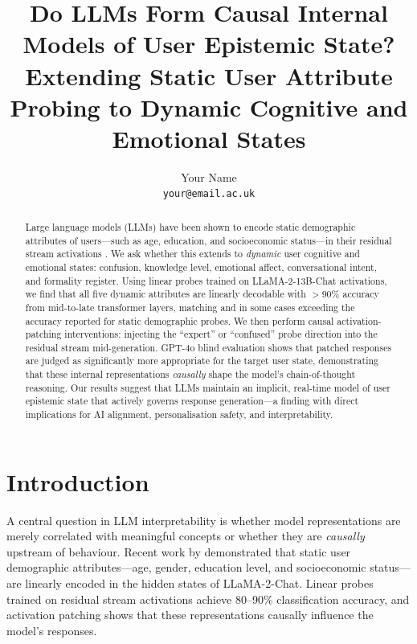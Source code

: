 \documentclass[11pt]{article}
\title{\textbf{Do LLMs Form Causal Internal Models of User Epistemic State?\\
\large Extending Static User Attribute Probing to Dynamic Cognitive and Emotional States}}
\author{
  Your Name \\
  \texttt{your@email.ac.uk}
}
\date{}
\begin{document}
\maketitle

\begin{abstract}
Large language models (LLMs) have been shown to encode static demographic
attributes of users—such as age, education, and socioeconomic status—in their
residual stream activations \citep{chen2024probing}.  We ask whether this
extends to \emph{dynamic} user cognitive and emotional states: confusion,
knowledge level, emotional affect, conversational intent, and formality register.
Using linear probes trained on LLaMA-2-13B-Chat activations, we find that all
five dynamic attributes are linearly decodable with $>90\%$ accuracy from mid-to-late
transformer layers, matching and in some cases exceeding the accuracy reported
for static demographic probes.  We then perform causal activation-patching
interventions: injecting the ``expert'' or ``confused'' probe direction into the
residual stream mid-generation.  GPT-4o blind evaluation shows that patched
responses are judged as significantly more appropriate for the target user state,
demonstrating that these internal representations \emph{causally} shape the
model's chain-of-thought reasoning.  Our results suggest that LLMs maintain
an implicit, real-time model of user epistemic state that actively governs
response generation—a finding with direct implications for AI alignment,
personalisation safety, and interpretability.
\end{abstract}

\section{Introduction}

A central question in LLM interpretability is whether model representations
are merely correlated with meaningful concepts or whether they are
\emph{causally} upstream of behaviour.  Recent work by \citet{chen2024probing}
demonstrated that static user demographic attributes—age, gender, education
level, and socioeconomic status—are linearly encoded in the hidden states of
LLaMA-2-Chat.  Linear probes trained on residual stream activations achieve
80--90\% classification accuracy, and activation patching shows that these
representations causally influence the model's responses.
\end{document}
